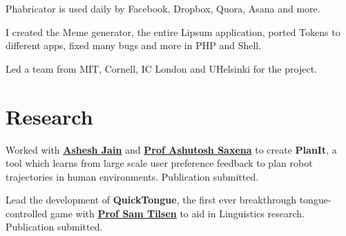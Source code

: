 \documentclass[a4paper]{resume}
\begin{document}
\begin{minipage}[t]{0.66\textwidth}
\sectionspace %



\begin{tightitemize}
\item Phabricator is used daily by Facebook, Dropbox, Quora, Asana and more.
\item I created the Meme generator, the entire Lipsum application, ported Tokens to different apps, fixed many bugs and more in PHP and Shell.
\item Led a team from MIT, Cornell, IC London and UHelsinki for the project.
\end{tightitemize}

\sectionspace %


\section{Research}


Worked with \textbf{\href{http://www.cs.cornell.edu/~ashesh/}{Ashesh Jain}} and \textbf{\href{http://www.cs.cornell.edu/~asaxena/}{Prof Ashutosh Saxena}} to create \textbf{PlanIt}, a tool which learns from large scale user preference feedback to plan robot trajectories in human environments. Publication submitted.

\sectionspace %



Lead the development of \textbf{QuickTongue}, the first ever breakthrough tongue-controlled game with \textbf{\href{http://conf.ling.cornell.edu/~tilsen/}{Prof Sam Tilsen}} to aid in Linguistics research. Publication submitted.

\sectionspace %


\end{minipage}
\end{document}
